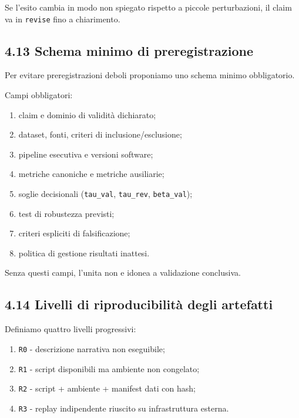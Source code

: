 Se l'esito cambia in modo non spiegato rispetto a piccole perturbazioni, il claim va in \texttt{revise} fino a chiarimento.

\subsection{4.13 Schema minimo di preregistrazione}

Per evitare preregistrazioni deboli proponiamo uno schema minimo obbligatorio.

Campi obbligatori:

\begin{enumerate}
\def\labelenumi{\arabic{enumi}.}
\tightlist
\item
  claim e dominio di validità dichiarato;
\item
  dataset, fonti, criteri di inclusione/esclusione;
\item
  pipeline esecutiva e versioni software;
\item
  metriche canoniche e metriche ausiliarie;
\item
  soglie decisionali (\texttt{tau\_val}, \texttt{tau\_rev}, \texttt{beta\_val});
\item
  test di robustezza previsti;
\item
  criteri espliciti di falsificazione;
\item
  politica di gestione risultati inattesi.
\end{enumerate}

Senza questi campi, l'unita non e idonea a validazione conclusiva.

\subsection{4.14 Livelli di riproducibilità degli artefatti}

Definiamo quattro livelli progressivi:

\begin{enumerate}
\def\labelenumi{\arabic{enumi}.}
\tightlist
\item
  \texttt{R0} - descrizione narrativa non eseguibile;
\item
  \texttt{R1} - script disponibili ma ambiente non congelato;
\item
  \texttt{R2} - script + ambiente + manifest dati con hash;
\item
  \texttt{R3} - replay indipendente riuscito su infrastruttura esterna.
\end{enumerate}

